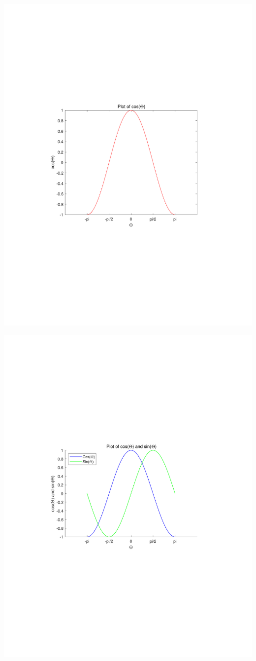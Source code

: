 \documentclass[a4paper,11pt]{article}
\begin{document}
	\includegraphics[width=\linewidth]{plot1}
	
	\vspace{10pt}
	
	\includegraphics[width=\linewidth]{plot2}

\end{document}
